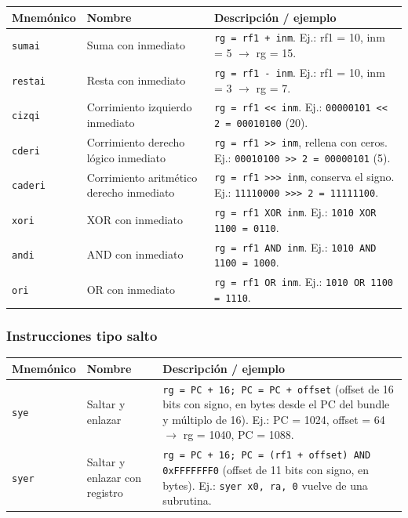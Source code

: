\begin{xltabular}{\textwidth}{@{}Xp{0.33\textwidth}p{0.5\textwidth}@{}}
\toprule\noalign{}
Mnemónico & Nombre & Descripción / ejemplo \\
\midrule\noalign{}
\endhead
\bottomrule\noalign{}
\endlastfoot
\texttt{sumai} & Suma con inmediato &
\texttt{rg = rf1 + inm}. Ej.: rf1 = 10, inm = 5 $\rightarrow$ rg =
15. \\
\texttt{restai} & Resta con inmediato &
\texttt{rg = rf1 - inm}. Ej.: rf1 = 10, inm = 3 $\rightarrow$ rg =
7. \\
\texttt{cizqi} & Corrimiento izquierdo inmediato &
\texttt{rg = rf1 \textless{}\textless{} inm}. Ej.: \texttt{00000101 \textless{}\textless{} 2 = 00010100} (20). \\
\texttt{cderi} & Corrimiento derecho lógico inmediato &
\texttt{rg = rf1 \textgreater{}\textgreater{} inm}, rellena con ceros. Ej.:
\texttt{00010100 \textgreater{}\textgreater{} 2 = 00000101} (5). \\
\texttt{caderi} & Corrimiento aritmético derecho
inmediato & \texttt{rg = rf1 \textgreater{}\textgreater{}\textgreater{} inm}, conserva el
signo. Ej.: \texttt{11110000 \textgreater{}\textgreater{}\textgreater{} 2 = 11111100}. \\
\texttt{xori} & XOR con inmediato &
\texttt{rg = rf1 XOR inm}. Ej.:
\texttt{1010 XOR 1100 = 0110}. \\
\texttt{andi} & AND con inmediato &
\texttt{rg = rf1 AND inm}. Ej.:
\texttt{1010 AND 1100 = 1000}. \\
\texttt{ori} & OR con inmediato &
\texttt{rg = rf1 OR inm}. Ej.:
\texttt{1010 OR 1100 = 1110}. \\
\end{xltabular}

\subsubsection{Instrucciones tipo salto}\label{instrucciones-tipo-salto}

\begin{xltabular}{\textwidth}{@{}Xp{0.25\textwidth}p{0.6\textwidth}@{}}
\toprule\noalign{}
Mnemónico & Nombre & Descripción / ejemplo \\
\midrule\noalign{}
\endhead
\bottomrule\noalign{}
\endlastfoot
\texttt{sye} & Saltar y enlazar &
\texttt{rg = PC + 16; PC = PC + offset} (offset de 16
bits con signo, en bytes desde el PC del bundle y múltiplo de 16). Ej.:
PC = 1024, offset = 64 $\rightarrow$ rg = 1040, PC = 1088. \\
\texttt{syer} & Saltar y enlazar con registro &
\texttt{rg = PC + 16; PC = (rf1 + offset) AND 0xFFFFFFF0}
(offset de 11 bits con signo, en bytes). Ej.:
\texttt{syer x0, ra, 0} vuelve de una subrutina. \\
\end{xltabular}

